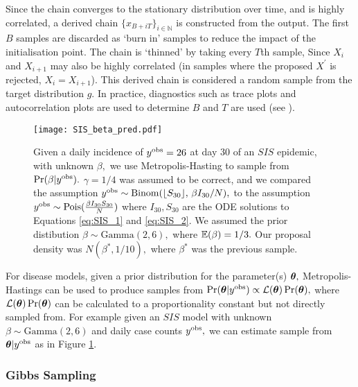 Since the chain converges to the stationary distribution over time, and is
highly correlated,
a derived chain $\{x_{B + iT}\}_{i \in \mathbb{N}}$ is constructed
from the output. The
first $B$ samples are discarded as `burn in' samples to reduce the impact
of the initialisation point. The chain is `thinned' by taking every $T$th sample,
Since $X_i$ and $X_{i + 1}$ may also be highly correlated (in samples where
the proposed $X^\prime$ is rejected, $X_i = X_{i + 1}$).
This derived chain is considered a
random sample from the target distribution $g.$
In practice, diagnostics such as trace plots and autocorrelation plots are used
to determine $B$ and $T$ are used (see
\cite[chapter 11]{gelman_bayesian_2014}).

\begin{figure}[htbp]
    \centering
    \texttt{[image: SIS\_beta\_pred.pdf]}
    \caption{
        Given a daily incidence of $y^{\mathrm{obs}} = 26$ at day 30 of an $SIS$ epidemic,
        with unknown $\beta,$ we use Metropolis-Hasting to
        sample from $\Pr(\beta | y^{\mathrm{obs}}).$
        $\gamma = 1/4$ was assumed to be correct, and we compared the assumption
        $y^{\mathrm{obs}}
            \sim \mathrm{Binom}(\lfloor S_{30} \rfloor,\, \beta I_{30}/N),$
        to the assumption $y^{\mathrm{obs}} \sim \operatorname{Pois}(\frac{\beta I_{30} S_{30}}{N})$
        where $I_{30}, S_{30}$ are the ODE solutions to Equations
        \ref{eq:SIS_1} and \ref{eq:SIS_2}. We assumed the prior distibution
        $\beta\sim \mathrm{Gamma}(2, 6),$ where $\operatorname{\mathbb{E}}(\beta) = 1/3.$ Our proposal
        density was $N(\beta^\ast, 1/10),$ where $\beta^\ast$ was the previous
        sample.
    }
    \label{fig:SIS_MH_R}
\end{figure}

For disease models, given a prior distribution for the parameter(s) $\bm{\theta},$
Metropolis-Hastings can be used to produce samples from
$\Pr(\bm{\theta} | y^{\mathrm{obs}}) \propto \mathcal{L}(\bm{\theta})\Pr(\bm{\theta}),$ where
$\mathcal{L}(\bm{\theta})\Pr(\bm{\theta})$ can be calculated to a proportionality
constant but not directly
sampled from. For example given an $SIS$ model with unknown
$\beta \sim \mathrm{Gamma}(2, 6)$ and daily case counts $y^{\mathrm{obs}},$ we can
estimate sample from $\bm{\theta} | y^{\mathrm{obs}}$ as in Figure \ref{fig:SIS_MH_R}.

\subsubsection*{Gibbs Sampling}


